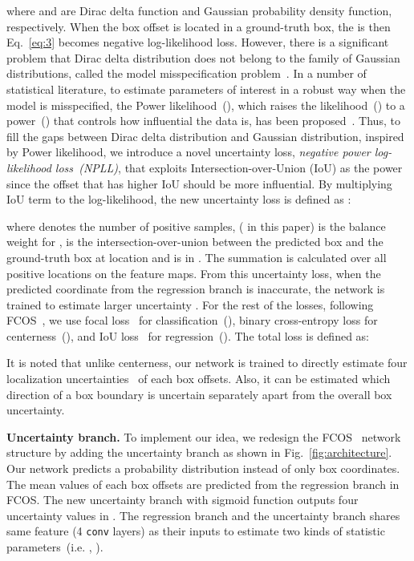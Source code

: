 \documentclass[final]{cvpr}
\begin{document}
where  and  are Dirac delta function and Gaussian probability density function, respectively.
When the box offset is located in a ground-truth box, the  is  then Eq.~\ref{eq:3} becomes negative log-likelihood loss.
However, there is a significant problem that Dirac delta distribution does not belong to the family of Gaussian distributions, called the model misspecification problem~\cite{holmes2017assigning}. 
In a number of statistical literature, to estimate parameters of interest in a robust way when the model is misspecified, the Power likelihood~(), which raises the likelihood~() to a power~() that controls how influential the data is, has been proposed~\cite{holmes2017assigning}. 
Thus, to fill the gaps between Dirac delta distribution and Gaussian distribution, inspired by Power likelihood, we introduce a novel uncertainty loss, \textit{negative power log-likelihood loss~(NPLL)}, that exploits Intersection-over-Union (IoU) as the power since the offset that has higher IoU should be more influential.
By multiplying IoU term to the log-likelihood, the new uncertainty loss is defined as :

\noindent
where  denotes the number of positive samples,  ( in this paper) is the balance weight for ,  is the intersection-over-union between the predicted box and the ground-truth box at location  and  is in .
The summation is calculated over all positive locations on the feature maps.
From this uncertainty loss, when the predicted coordinate  from the regression branch is inaccurate, the network is trained to estimate larger uncertainty .
For the rest of the losses, following FCOS~\cite{Tian_2019_ICCV}, we use focal loss~\cite{lin2018focal} for classification~(), binary cross-entropy loss for centerness~(), and IoU loss~\cite{yu2016unitbox} for regression~().
The total loss is defined as:

It is noted that unlike centerness, our network is trained to directly estimate four localization uncertainties~ of each box offsets.
Also, it can be estimated which direction of a box boundary is uncertain separately apart from the overall box uncertainty.

\medskip

\noindent
\textbf{Uncertainty branch.} To implement our idea, we redesign the FCOS~\cite{Tian_2019_ICCV} network structure by adding the uncertainty branch as shown in Fig.~\ref{fig:architecture}.
Our network predicts a probability distribution instead of only box coordinates.
The mean values  of each box offsets are predicted from the regression branch in FCOS.
The new uncertainty branch with sigmoid function outputs four uncertainty values  in .
The regression branch and the uncertainty branch shares same feature (4 \texttt{conv} layers) as their inputs to estimate two kinds of statistic parameters~(i.e. , ).
\end{document}
